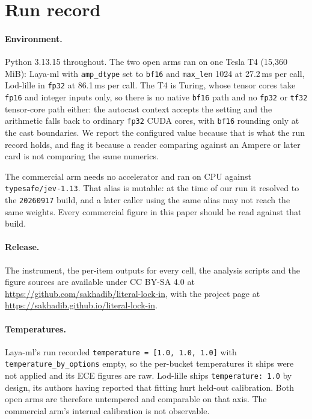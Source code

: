 \documentclass[11pt]{article}
\begin{document}
\section{Run record}
\label{app:repro}

\paragraph{Environment.} Python 3.13.15 throughout. The two open arms ran on one
Tesla T4 (15{,}360\,MiB): Laya-ml with \texttt{amp\_dtype} set to \texttt{bf16}
and \texttt{max\_len} 1024 at 27.2\,ms per call, Lod-lille in \texttt{fp32} at
86.1\,ms per call. The T4 is Turing, whose tensor cores take \texttt{fp16} and
integer inputs only, so there is no native \texttt{bf16} path and no
\texttt{fp32} or \texttt{tf32} tensor-core path either: the autocast context
accepts the setting and the arithmetic falls back to ordinary \texttt{fp32} CUDA
cores, with \texttt{bf16} rounding only at the cast boundaries. We report the configured value because that is what the run record
holds, and flag it because a reader comparing against an Ampere or later card is
not comparing the same numerics.

The commercial arm needs no accelerator and ran on CPU against
\texttt{typesafe/jev-1.13}. That alias is mutable: at the time of our run it
resolved to the \texttt{20260917} build, and a later caller using the same alias
may not reach the same weights. Every commercial figure in this paper should be
read against that build.

\paragraph{Release.} The instrument, the per-item outputs for every cell, the
analysis scripts and the figure sources are available under CC BY-SA 4.0 at
\url{https://github.com/sakhadib/literal-lock-in}, with the project page at
\url{https://sakhadib.github.io/literal-lock-in}.

\paragraph{Temperatures.} Laya-ml's run recorded
\texttt{temperature = [1.0, 1.0, 1.0]} with \texttt{temperature\_by\_options}
empty, so the per-bucket temperatures it ships were not applied and its ECE
figures are raw. Lod-lille ships \texttt{temperature: 1.0} by design, its
authors having reported that fitting hurt held-out calibration. Both open arms
are therefore untempered and comparable on that axis. The commercial arm's
internal calibration is not observable.
\end{document}
